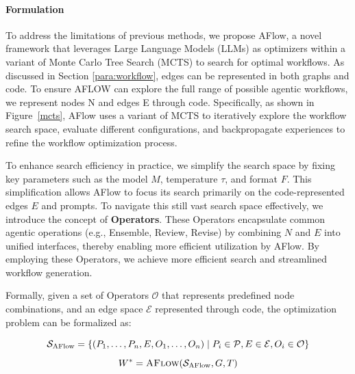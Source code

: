 \documentclass{article} %
\newcommand{\model}{{\sc AFlow}\xspace}
\theoremstyle{plain}
\theoremstyle{definition}
\theoremstyle{remark}
\begin{document}
\paragraph{Formulation}
To address the limitations of previous methods, we propose \model, a novel framework that leverages Large Language Models (LLMs) as optimizers within a variant of Monte Carlo Tree Search (MCTS) to search for optimal workflows. 
As discussed in Section \ref{para:workflow}, edges can be represented in both graphs and code. To ensure AFLOW can explore the full range of possible agentic workflows, we represent nodes N and edges E through code.
Specifically, as shown in Figure~\ref{mcts}, \model uses a variant of MCTS to iteratively explore the workflow search space, evaluate different configurations, and backpropagate experiences to refine the workflow optimization process.


To enhance search efficiency in practice, we simplify the search space by fixing key parameters such as the model $M$, temperature $\tau$, and format $F$. This simplification allows \model to focus its search primarily on the code-represented edges $E$ and prompts. To navigate this still vast search space effectively, we introduce the concept of \textbf{Operators}. These Operators encapsulate common agentic operations (e.g., Ensemble, Review, Revise) by combining $N$ and $E$ into unified interfaces, thereby enabling more efficient utilization by \model. By employing these Operators, we achieve more efficient search and streamlined workflow generation.

Formally, given a set of Operators $\mathcal{O}$ that represents predefined node combinations, and an edge space $\mathcal{E}$ represented through code, the optimization problem can be formalized as:

\begin{equation}
\mathcal{S}_\text{AFlow} = \{ (P_1, \ldots, P_n, E, O_1, \ldots, O_n) \mid P_i \in \mathcal{P}, E \in \mathcal{E}, O_i \in \mathcal{O} \} \\
\end{equation}
\begin{equation}
W^* = \text{\model}(\mathcal{S}_\text{AFlow}, G, T) 
\end{equation}
\end{document}

